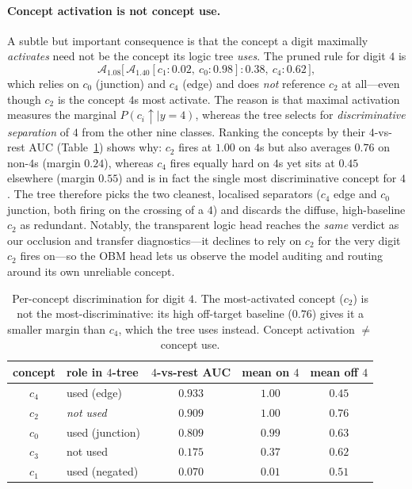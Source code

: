 \paragraph{Concept activation is not concept use.}
A subtle but important consequence is that the concept a digit maximally
\emph{activates} need not be the concept its logic tree \emph{uses}. The
pruned rule for digit $4$ is
\[
\mathcal{A}_{1.08}\!\big[\,\mathcal{A}_{1.40}[c_{1}{:}0.02,\ c_{0}{:}0.98]{:}0.38,\
c_{4}{:}0.62\,\big],
\]
which relies on $c_0$ (junction) and $c_4$ (edge) and does \emph{not} reference
$c_2$ at all---even though $c_2$ is the concept $4$s most activate. The reason is
that maximal activation measures the marginal $P(c_i\!\uparrow\mid y{=}4)$,
whereas the tree selects for \emph{discriminative separation} of $4$ from the
other nine classes. Ranking the concepts by their $4$-vs-rest AUC
(Table~\ref{tab:digit4-use}) shows why: $c_2$ fires at $1.00$ on $4$s but also
averages $0.76$ on non-$4$s (margin $0.24$), whereas $c_4$ fires equally hard on
$4$s yet sits at $0.45$ elsewhere (margin $0.55$) and is in fact the single most
discriminative concept for $4$. The tree therefore picks the two cleanest,
localised separators ($c_4$ edge and $c_0$ junction, both firing on the crossing
of a $4$) and discards the diffuse, high-baseline $c_2$ as redundant. Notably,
the transparent logic head reaches the \emph{same} verdict as our occlusion and
transfer diagnostics---it declines to rely on $c_2$ for the very digit $c_2$
fires on---so the OBM head lets us observe the model auditing and routing around
its own unreliable concept.

\begin{table}[t]
\centering
\small
\begin{tabular}{clccc}
\toprule
concept & role in $4$-tree & $4$-vs-rest AUC & mean on $4$ & mean off $4$ \\
\midrule
$c_4$ & used (edge)      & $\mathbf{0.933}$ & $1.00$ & $0.45$ \\
$c_2$ & \emph{not used}  & $0.909$ & $1.00$ & $0.76$ \\
$c_0$ & used (junction)  & $0.809$ & $0.99$ & $0.63$ \\
$c_3$ & not used         & $0.175$ & $0.37$ & $0.62$ \\
$c_1$ & used (negated)   & $0.070$ & $0.01$ & $0.51$ \\
\bottomrule
\end{tabular}
\caption{Per-concept discrimination for digit $4$. The most-activated concept
($c_2$) is not the most-discriminative: its high off-target baseline ($0.76$)
gives it a smaller margin than $c_4$, which the tree uses instead. Concept
activation $\neq$ concept use.}
\label{tab:digit4-use}
\end{table}

